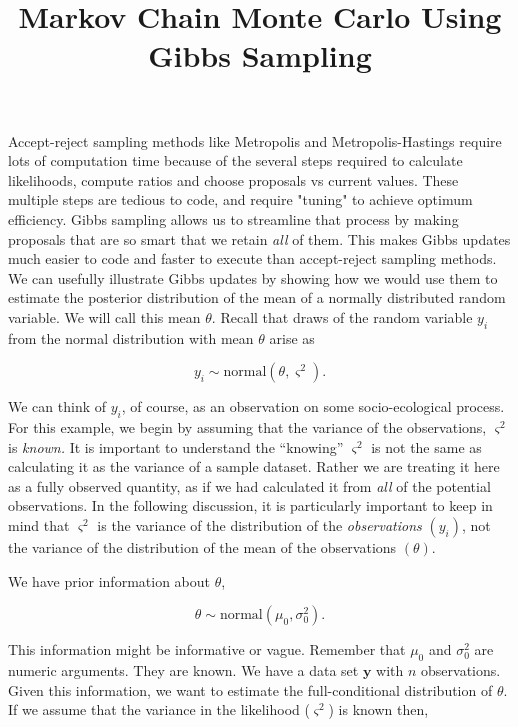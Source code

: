 \documentclass[11pt]{article}
\begin{document}
\title{Markov Chain Monte Carlo Using Gibbs Sampling}

\maketitle

Accept-reject sampling methods like Metropolis  and Metropolis-Hastings require lots of computation time because of the several steps required to calculate likelihoods, compute ratios and choose proposals vs current values. These multiple steps are tedious to code, and require "tuning" to achieve optimum efficiency. 
 Gibbs sampling allows us to streamline that process by making proposals that are so smart that we retain \emph{all }of them.  This makes Gibbs updates much easier to code and faster to execute than accept-reject sampling methods. We can usefully illustrate Gibbs updates by showing how we would use them to estimate the posterior distribution of the mean of a normally distributed random variable.  We will call this mean $\theta$. Recall that draws of the random variable $y_{i}$ from the normal distribution with mean $\theta$ arise as  

\begin{equation}
y_{i}\sim\text{normal}(\theta,\varsigma^{2}).
\end{equation}

We can think of $y_{i}$, of course, as an observation on some socio-ecological process. For this example, we begin by assuming that the variance of the observations, $\varsigma^{2}$ is \emph{known. }It is important to understand the ``knowing'' $\varsigma^{2}$ is not the same as calculating it as the variance of a sample dataset. Rather we are
treating it here as a fully observed quantity, as if we had calculated it from \emph{all} of the potential observations. In the following discussion, it is particularly important to keep in mind that $\varsigma^{2}$ is the variance of the distribution of the \emph{observations} $\left(y_{i}\right)$, not the variance of the distribution of the mean of the observations
$\left(\theta\right)$.

We have prior information about $\theta$,

\begin{equation}
\theta\sim\text{normal}\left(\mu_{0},\sigma_{0}^{2}\right).
\end{equation}

This information might be informative or vague. Remember that $\mu_{0}$ and $\sigma_{0}^{2}$ are numeric arguments. They are known. We have a data set\textbf{ $\mathbf{y}$ }with $n$ observations. Given this information, we want to estimate the full-conditional distribution of $\theta$. If we assume that the variance in the likelihood ($\varsigma^{2}$) is\emph{ }known\emph{ $ $}then, 
\end{document}
